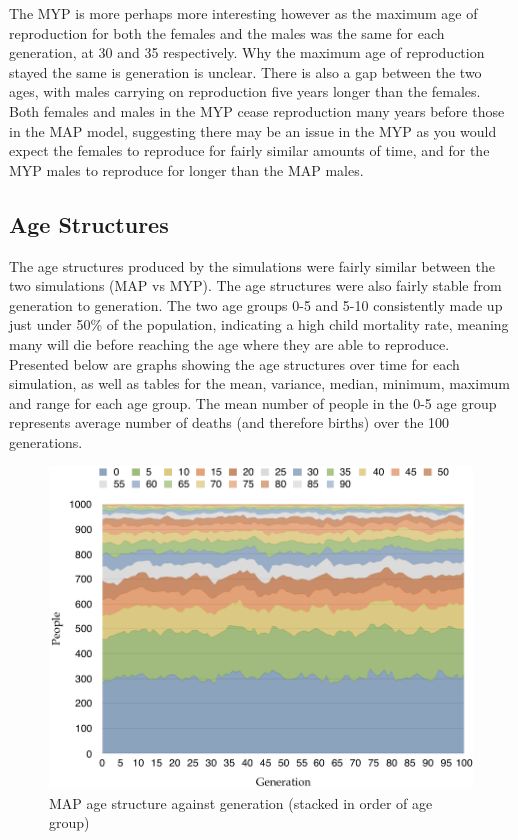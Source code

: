 \documentclass[authoryearcitations]{UoYCSproject}
\begin{document}
The MYP is more perhaps more interesting however as the maximum age of reproduction for both the females and the males was the same for each generation, at 30 and 35 respectively. Why the maximum age of reproduction stayed the same is generation is unclear. There is also a gap between the two ages, with males carrying on reproduction five years longer than the females. Both females and males in the MYP cease reproduction many years before those in the MAP model, suggesting there may be an issue in the MYP as you would expect the females to reproduce for fairly similar amounts of time, and for the MYP males to reproduce for longer than the MAP males.

\subsection{Age Structures}
The age structures produced by the simulations were fairly similar between the two simulations (MAP vs MYP). The age structures were also fairly stable from generation to generation. The two age groups 0-5 and 5-10 consistently made up just under 50\% of the population, indicating a high child mortality rate, meaning many will die before reaching the age where they are able to reproduce. Presented below are graphs showing the age structures over time for each simulation, as well as tables for the mean, variance, median, minimum, maximum and range for each age group. The mean number of people in the 0-5 age group represents average number of deaths (and therefore births) over the 100 generations.

\begin{figure}[h]
\includegraphics[scale=0.6]{map_age_data}
\caption{MAP age structure against generation (stacked in order of age group)}
\label{fig:mapResultsGraph}
\end{figure}
\end{document}
